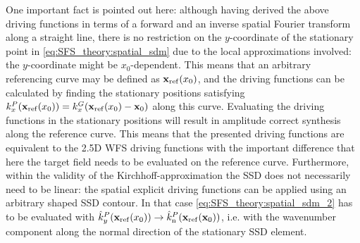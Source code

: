 One important fact is pointed out here: although having derived the above driving functions in terms of a forward and an inverse spatial Fourier transform along a straight line, there is no restriction on the $y$-coordinate of the stationary point in \eqref{eq:SFS_theory:spatial_sdm} due to the local approximations involved: the $y$-coordinate might be $x_0$-dependent.
This means that an arbitrary referencing curve may be defined as $\mathbf{x}_{\mathrm{ref}}(x_0)$, and the driving functions can be calculated by finding the stationary positions 
satisfying $k_x^P(\mathbf{x}_{\mathrm{ref}}(x_0)) = k_x^G(\mathbf{x}_{\mathrm{ref}}(x_0) - \mathbf{x}_0)$ along this curve.
Evaluating the driving functions in the stationary positions will result in amplitude correct synthesis along the reference curve. 
This means that the presented driving functions are equivalent to the 2.5D WFS driving functions with the important difference that here the target field needs to be evaluated on the reference curve.
Furthermore, within the validity of the Kirchhoff-approximation the SSD does not necessarily need to be linear: the spatial explicit driving functions can be applied using an arbitrary shaped SSD contour.
In that case \eqref{eq:SFS_theory:spatial_sdm_2} has to be evaluated with $\hat{k}_y^{P}(\mathbf{x}_{\mathrm{ref}}(x_0)) \rightarrow \hat{k}_{\mathrm{n}}^{P}(\mathbf{x}_{\mathrm{ref}}(\mathbf{x}_0))$, i.e. with the wavenumber component along the normal direction of the stationary SSD element.

